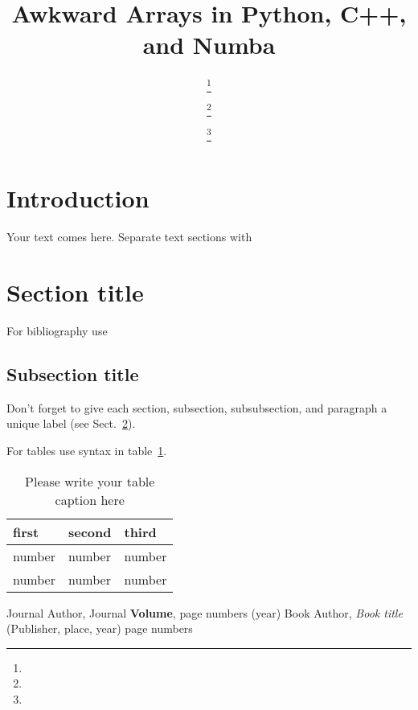 \documentclass{webofc}
\begin{document}
\title{Awkward Arrays in Python, C++, and Numba}

\author{ \fnsep\thanks{} \and
         \fnsep\thanks{} \and
         \fnsep\thanks{}
}



\maketitle

\section{Introduction}
\label{intro}
Your text comes here. Separate text sections with

\section{Section title}
\label{sec-1}
For bibliography use \cite{RefJ}

\subsection{Subsection title}
\label{sec-2}
Don't forget to give each section, subsection, subsubsection, and
paragraph a unique label (see Sect.~\ref{sec-1}).

For tables use syntax in table~\ref{tab-1}.
\begin{table}
\centering
\caption{Please write your table caption here}
\label{tab-1}

\begin{tabular}{lll}
\hline
first & second & third  \\\hline
number & number & number \\
number & number & number \\\hline
\end{tabular}

\vspace*{5cm}
\end{table}

% 
%
%
\begin{thebibliography}{}
%
%
Journal Author, Journal \textbf{Volume}, page numbers (year)
Book Author, \textit{Book title} (Publisher, place, year) page numbers
\end{thebibliography}
\end{document}
